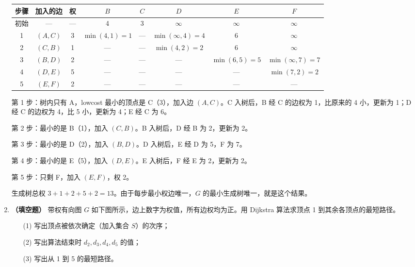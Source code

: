 \begin{enumerate}
\begin{center}
\small
\begin{tabular}{|c|c|c|c|c|c|c|c|}
\hline
步骤 & 加入的边 & 权 & $B$ & $C$ & $D$ & $E$ & $F$ \\
\hline
初始 & — & — & 4 & 3 & $\infty$ & $\infty$ & $\infty$ \\
1 & $(A,C)$ & 3 & $\min(4,1)=1$ & — & $\min(\infty,4)=4$ & 6 & $\infty$ \\
2 & $(C,B)$ & 1 & — & — & $\min(4,2)=2$ & 6 & $\infty$ \\
3 & $(B,D)$ & 2 & — & — & — & $\min(6,5)=5$ & $\min(\infty,7)=7$ \\
4 & $(D,E)$ & 5 & — & — & — & — & $\min(7,2)=2$ \\
5 & $(E,F)$ & 2 & — & — & — & — & — \\
\hline
\end{tabular}
\end{center}

第 1 步：树内只有 A，lowcost 最小的顶点是 C（3），加入边 $(A,C)$。C 入树后，B 经 C 的边权为 1，比原来的 4 小，更新为 1；D 经 C 的边权为 4，比 5 小，更新为 4；E 经 C 为 6。

第 2 步：最小的是 B（1），加入 $(C,B)$。B 入树后，D 经 B 为 2，更新为 2。

第 3 步：最小的是 D（2），加入 $(B,D)$。D 入树后，E 经 D 为 5，F 为 7。

第 4 步：最小的是 E（5），加入 $(D,E)$。E 入树后，F 经 E 为 2，更新为 2。

第 5 步：只剩 F，加入 $(E,F)$，权 2。

生成树总权 $3+1+2+5+2=13$。由于每步最小权边唯一，$G$ 的最小生成树唯一，就是这个结果。

\else \answerarea[10] \fi

\item \textbf{（填空题）} 带权有向图 $G$ 如下图所示，边上数字为权值，所有边权均为正。用 Dijkstra 算法求顶点 1 到其余各顶点的最短路径。
\begin{enumerate}
\item[(1)] 写出顶点被依次确定（加入集合 $S$）的次序；
\item[(2)] 写出算法结束时 $d_2,d_3,d_4,d_5$ 的值；
\item[(3)] 写出从 1 到 5 的最短路径。
\end{enumerate}


\end{enumerate}
